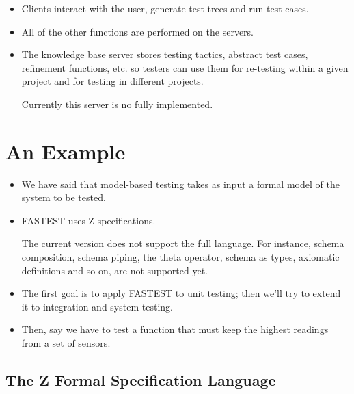 \begin{itemize}
\begin{itemize}
\item Clients interact with the user, generate test trees and run test cases. 

\item All of the other functions are performed on the servers.

\item The knowledge base server stores testing tactics, abstract test cases, refinement functions, etc. so testers can use them for re-testing within a given project and for testing in different projects.

Currently this server is no fully implemented.
\end{itemize}

\end{itemize}

\pagebreak

\section{An Example}

\begin{itemize}
\item We have said that model-based testing takes as input a formal model of the system to be tested.

\item FASTEST uses Z specifications. 

The current version does not support the full language. For instance, schema composition, schema piping, the theta operator, schema as types, axiomatic definitions and so on, are not supported yet.

\item The first goal is to apply FASTEST to unit testing; then we'll try to extend it to integration and system testing.

\item Then, say we have to test a function that must keep the highest readings from a set of sensors.

\end{itemize}

\subsection{The Z Formal Specification Language}

